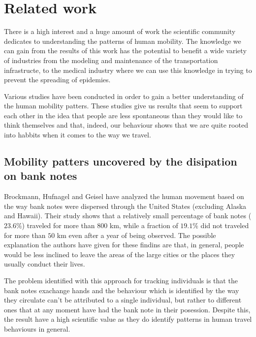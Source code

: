 \chapter{Related work}
\label{relatedwork}
There is a high interest and a huge amount of work the scientific community
dedicates to understanding the patterns of human mobility. The knowledge we can
gain from the results of this work has the potential to benefit a wide variety
of industries from the modeling and maintenance of the transportation
infrastructe, to the medical industry where we can use this knowledge in trying
to prevent the spreading of epidemies. \cite{Brockmann08} %

Various studies have been conducted in order to gain a better understanding of
the human mobility patters. These studies give us results that seem to support
each other in the idea that people are less spontaneous than they would like to
think themselves and that, indeed, our behaviour shows that we are quite rooted
into habbits when it comes to the way we travel.

\section{Mobility patters uncovered by the disipation on bank notes}
Brockmann, Hufnagel and Geisel\cite{Brockmann06} have analyzed the human movement
based on the way bank notes were dispersed through the United States (excluding
Alaska and Hawaii). Their study shows that a relatively small percentage of bank
notes ($23.6\%$) traveled for more than $800$ km, while a fraction of $19.1\%$
did not traveled for more than $50$ km even after a year of being observed. The
possible explanation the authors have given for these findins are that, in
general, people would be less inclined to leave the areas of the large cities or
the places they usually conduct their lives.

The problem identified with this approach for tracking individuals is that the
bank notes exachange hands and the behaviour which is identified by the way they
circulate can't be attributed to a single individual, but rather to different
ones that at any moment have had the bank note in their posession. Despite this,
the result have a high scientific value as they do identify patterns in human
travel behaviours in general.

